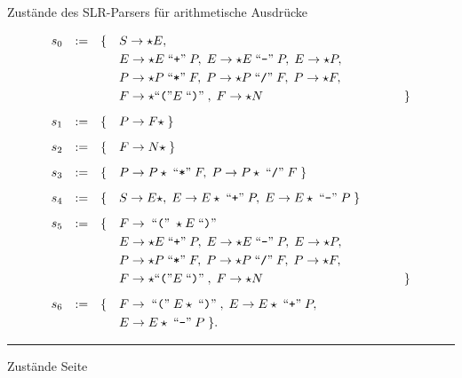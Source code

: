 \documentclass{slides}
\newcommand{\squoted}[1]{\mbox{``\texttt{#1}''}}
\newcommand{\quoted}[1]{\;\mbox{``\texttt{#1}''}\;}
\newcounter{mypage}
\begin{document}

\begin{slide}{}
\normalsize
\begin{center}
Zust\"ande des SLR-Parsers f\"ur arithmetische Ausdr\"ucke
\end{center}
\vspace{0.5cm}

\footnotesize


\[ 
\begin{array}[t]{lcrl}
s_0 & := & \{ & S \rightarrow \star E,                \\[0.1cm]
    &    &    & E \rightarrow \star E \quoted{+} P,\; 
                E \rightarrow \star E \quoted{-} P,\;
                E \rightarrow \star P, \\[0.1cm]
    &    &    & P \rightarrow \star P \quoted{*} F,\;
                P \rightarrow \star P \quoted{/} F,\;
                P \rightarrow \star F,                \\[0.1cm]
    &    &    & F \rightarrow \star \squoted{(} E \quoted{)},\;
                F \rightarrow \star N   \hspace*{4.0cm} \} \\[0.3cm]
s_1 & := & \{ & P \rightarrow F \star \;\}                \\[0.3cm]
s_2 & := & \{ & F \rightarrow N \star \; \}               \\[0.3cm]
s_3 & := & \{ & P \rightarrow P \star \quoted{*} F,\; P \rightarrow P \star \quoted{/} F \; \} \\[0.3cm]
s_4 & := & \{ & S \rightarrow E \star,\;
                E \rightarrow E \star \quoted{+} P,\; 
                E \rightarrow E \star \quoted{-} P \; \}  \\[0.3cm]
s_5 & := & \{ & F \rightarrow \quoted{(} \star E \quoted{)} \\[0.1cm]
    &    &    & E \rightarrow \star E \quoted{+} P,\; 
                E \rightarrow \star E \quoted{-} P,\;
                E \rightarrow \star P,                  \\[0.1cm]
    &    &    & P \rightarrow \star P \quoted{*} F,\;
                P \rightarrow \star P \quoted{/} F,\;
                P \rightarrow \star F,                \\[0.1cm]
    &    &    & F \rightarrow \star \squoted{(} E \quoted{)},\;
                F \rightarrow \star N   \hspace*{4.0cm} \}  \\[0.3cm]
s_6 & := & \{ & F \rightarrow \quoted{(} E \star \quoted{)},\;
                E \rightarrow E \star \quoted{+} P,\; \\[0.1cm]
    &    &    & E \rightarrow E \star \quoted{-} P\;
           \}.
\end{array}
\]




\vspace*{\fill}
\tiny \addtocounter{mypage}{1}
\rule{17cm}{1mm}
Zust\"ande  \hspace*{\fill} Seite 
\end{slide}
\end{document}
